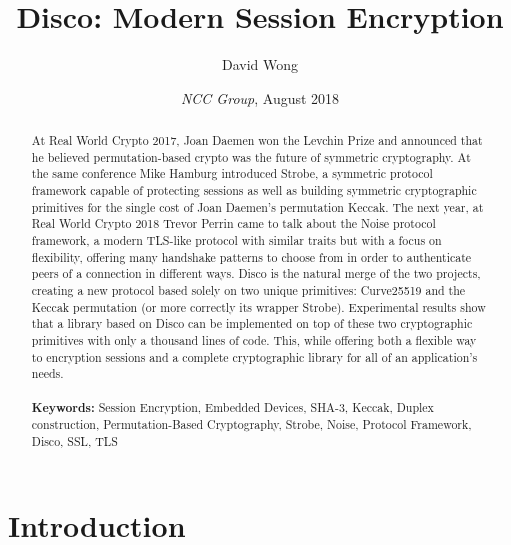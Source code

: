 \documentclass{article}
\title{Disco: Modern Session Encryption}
\author{David Wong}
\date{\emph{NCC Group}, \small{August 2018}}
\begin{document}
\maketitle
\renewcommand{\abstractname}{Abstract}
\begin{abstract}
At Real World Crypto 2017, Joan Daemen won the Levchin Prize and announced that he believed permutation-based crypto was the future of symmetric cryptography. At the same conference Mike Hamburg introduced Strobe, a symmetric protocol framework capable of protecting sessions as well as building symmetric cryptographic primitives for the single cost of Joan Daemen's permutation Keccak. The next year, at Real World Crypto 2018 Trevor Perrin came to talk about the Noise protocol framework, a modern TLS-like protocol with similar traits but with a focus on flexibility, offering many handshake patterns to choose from in order to authenticate peers of a connection in different ways. Disco is the natural merge of the two projects, creating a new protocol based solely on two unique primitives: Curve25519 and the Keccak permutation (or more correctly its wrapper Strobe). Experimental results show that a library based on Disco can be implemented on top of these two cryptographic primitives with only a thousand lines of code. This, while offering both a flexible way to encryption sessions and a complete cryptographic library for all of an application's needs.\\
\\
\textbf{Keywords:} Session Encryption, Embedded Devices, SHA-3, Keccak, Duplex construction, Permutation-Based Cryptography, Strobe, Noise, Protocol Framework, Disco, SSL, TLS\\

\end{abstract}
\vfill

\section{Introduction}\label{introduction}
\end{document}
